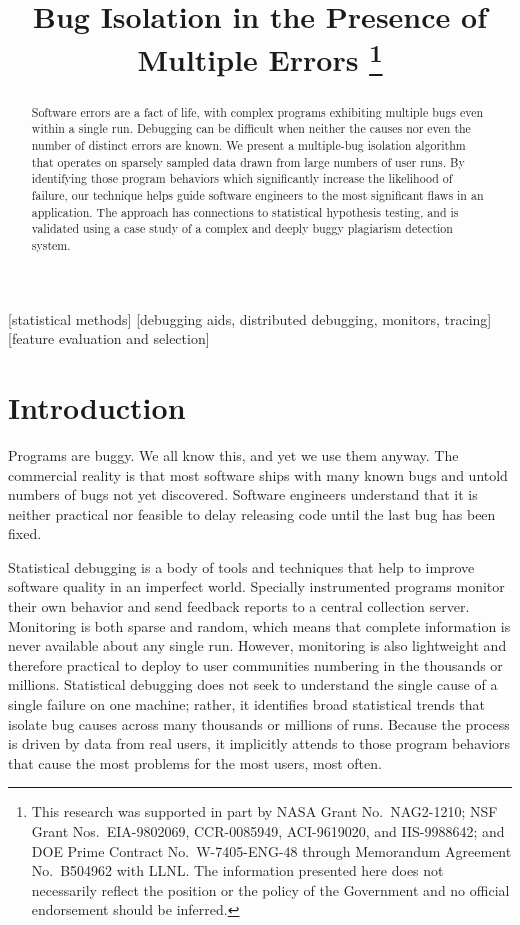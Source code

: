 \documentclass{sig-alternate}
\title{Bug Isolation in the Presence of Multiple Errors
  \thanks{This research was supported in part by NASA Grant No.\
    NAG2-1210; NSF Grant Nos.\ EIA-9802069, CCR-0085949, ACI-9619020,
    and IIS-9988642; and DOE Prime Contract No.\ W-7405-ENG-48 through
    Memorandum Agreement No.\ B504962 with LLNL.  The information
    presented here does not necessarily reflect the position or the
    policy of the Government and no official endorsement should be
    inferred.}}
\author{
  \alignauthor Ben Liblit \eecs \\
  \alignauthor Mayur Naik \stan \\
  \alignauthor Alice X.\ Zheng \eecs \\
  \moreauthors
  \global\multiply\auwidth by 3
  \global\divide\auwidth by 2
  \alignauthor Alex Aiken \stan \\
  \alignauthor Michael I.\ Jordan \both
  \moreauthors
  \alignauthor
  \affaddr{\eecs Department of Electrical \\ Engineering and Computer Science} \\
  \affaddr{\stat Department of Statistics} \\
  \affaddr{University of California, Berkeley} \\
  \affaddr{Berkeley, CA 94720-1776}
  \alignauthor
  \affaddr{\stan Computer Science Department} \\
  \affaddr{353 Serra Mall} \\
  \affaddr{Stanford University} \\
  \affaddr{Stanford CA 94305-9025}
}
\begin{document}
\CopyrightYear{2004}
\maketitle

\begin{abstract}
  Software errors are a fact of life, with complex programs exhibiting
  multiple bugs even within a single run.  Debugging can be difficult
  when neither the causes nor even the number of distinct errors are
  known.  We present a multiple-bug isolation algorithm that operates
  on sparsely sampled data drawn from large numbers of user runs.  By
  identifying those program behaviors which significantly increase the
  likelihood of failure, our technique helps guide software engineers
  to the most significant flaws in an application.  The approach has
  connections to statistical hypothesis testing, and is validated
  using a case study of a complex and deeply buggy plagiarism
  detection system.
\end{abstract}

[statistical methods]
[debugging aids, distributed debugging, monitors, tracing]
[feature
  evaluation and selection]




\section{Introduction}
\label{sec:introduction}

Programs are buggy.  We all know this, and yet we use them anyway.
The commercial reality is that most software ships with many known
bugs and untold numbers of bugs not yet discovered.  Software
engineers understand that it is neither practical nor feasible to
delay releasing code until the last bug has been fixed.

Statistical debugging is a body of tools and techniques that help to
improve software quality in an imperfect world.  Specially
instrumented programs monitor their own behavior and send feedback
reports to a central collection server.  Monitoring is both sparse and
random, which means that complete information is never available about
any single run.  However, monitoring is also lightweight and therefore
practical to deploy to user communities numbering in the thousands or
millions.  Statistical debugging does not seek to understand the
single cause of a single failure on one machine; rather, it identifies
broad statistical trends that isolate bug causes across many thousands
or millions of runs.  Because the process is driven by data from real
users, it implicitly attends to those program behaviors that cause the
most problems for the most users, most often.
\end{document}
